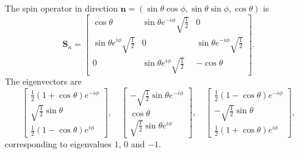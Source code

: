The spin operator in direction $\bm{n} = (\sin\theta\cos\phi,\sin\theta\sin\phi,\cos\theta)$ is
\[\bm{S}_{n} =  \left[ \begin{matrix} \cos\theta& \sin\theta e^{-i\phi} \sqrt{\frac{1}{2}}& 0\\ \sin\theta e^{i\phi}\sqrt{\frac{1}{2}}& 0& \sin\theta e^{-i\phi} \sqrt{\frac{1}{2}}\\ 0& \sin\theta e^{i\phi} \sqrt{\frac{1}{2}}& -\cos\theta\end{matrix} \right].\]
The eigenvectors are
\[\left[ \begin{matrix} \frac{1}{2}(1+\cos\theta)e^{-i\phi}\\ \sqrt{\frac{1}{2}}\sin\theta \\ \frac{1}{2}(1-\cos\theta)e^{i\phi} \end{matrix} \right] , \quad \left[ \begin{matrix} -\sqrt{\frac{1}{2}}\sin\theta e^{-i\phi}\\ \cos\theta \\ \sqrt{\frac{1}{2}}\sin\theta e^{i\phi} \end{matrix} \right] , \quad \left[ \begin{matrix} \frac{1}{2}(1-\cos\theta)e^{-i\phi}\\ -\sqrt{\frac{1}{2}}\sin\theta \\ \frac{1}{2}(1+\cos\theta)e^{i\phi} \end{matrix} \right],\]
corresponding to eigenvalues $1$, $0$ and $-1$.

